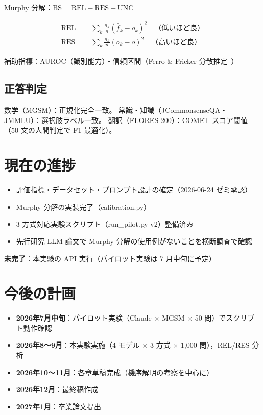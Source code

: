 \documentclass[10pt,a4paper,twocolumn]{article}
\begin{document}
Murphy 分解：$\text{BS} = \text{REL} - \text{RES} + \text{UNC}$

\begin{align}
  \text{REL} &= \sum_k \frac{n_k}{n}(\bar{f}_k - \bar{o}_k)^2 \quad \text{（低いほど良）} \\
  \text{RES} &= \sum_k \frac{n_k}{n}(\bar{o}_k - \bar{o})^2 \quad \text{（高いほど良）}
\end{align}

補助指標：AUROC（識別能力）・信頼区間（Ferro \& Fricker 分散推定~\cite{ferro2012decomposition}）

\subsection*{正答判定}

数学（MGSM）：正規化完全一致。
常識・知識（JCommonsenseQA・JMMLU）：選択肢ラベル一致。
翻訳（FLORES-200）：COMET スコア閾値（50 文の人間判定で F1 最適化）。

\section{現在の進捗}

\begin{itemize}
  \item 評価指標・データセット・プロンプト設計の確定（2026-06-24 ゼミ承認）
  \item Murphy 分解の実装完了（calibration.py）
  \item 3 方式対応実験スクリプト（run\_pilot.py v2）整備済み
  \item 先行研究 LLM 論文で Murphy 分解の使用例がないことを横断調査で確認
\end{itemize}

\textbf{未完了}：本実験の API 実行（パイロット実験は 7 月中旬に予定）

\section{今後の計画}

\begin{itemize}
  \item \textbf{2026年7月中旬}：パイロット実験（Claude × MGSM × 50 問）でスクリプト動作確認
  \item \textbf{2026年8〜9月}：本実験実施（4 モデル × 3 方式 × 1,000 問），REL/RES 分析
  \item \textbf{2026年10〜11月}：各章草稿完成（機序解明の考察を中心に）
  \item \textbf{2026年12月}：最終稿作成
  \item \textbf{2027年1月}：卒業論文提出
\end{itemize}
\end{document}
